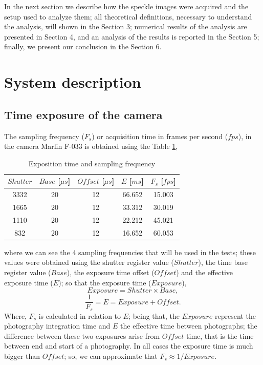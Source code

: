 \documentclass[review]{elsarticle}
\begin{document}
In the next section we describe how the speckle images were acquired and the setup used to analyze them; 
all theoretical definitions, necessary to understand the analysis, will shown in the Section 3;
numerical results of the analysis  are presented in Section 4, and
an analysis of the results is reported in the Section 5; finally, we present our
conclusion in the Section 6.

\section{System description}
\label{sec:description}




\subsection{Time exposure of the camera}
\label{subsec:expositiontime}
The sampling frequency ($F_s$) or acquisition time in frames per second ($fps$), 
in the camera Marlin F-033 is obtained using the 
 Table \ref{table:1}, 
\begin{table}[h!]
\centering
\begin{tabular}{||c c c c c||} 
 \hline
 $Shutter$ &  $Base$ [$\mu s$] & $Offset$ [$\mu s$] & $E$ [$ms$] & $F_s$ [$fps$]\\ [0.5ex] 
 \hline\hline
 3332  & 20  & 12  & 66.652  & 15.003  \\ 
 1665  & 20  & 12  & 33.312  & 30.019  \\ 
 1110  & 20  & 12  & 22.212  & 45.021  \\ 
 832   & 20  & 12  & 16.652  & 60.053  \\ [1ex] 
 \hline
\end{tabular}
\caption{Exposition time and sampling frequency}
\label{table:1}
\end{table}
where we can see the 4 sampling frequencies that will be used in the tests;
these values were obtained using  
the shutter register value ($Shutter$), 
the time base register value ($Base$),
the exposure time offset ($Offset$) and
the effective exposure time ($E$);
 so that the exposure time ($Exposure$),
\begin{equation}
Exposure= Shutter \times Base,
\end{equation}
\begin{equation}
\frac{1}{F_s}=E= Exposure + Offset.
\end{equation}
Where,  $F_s$ is calculated in relation to $E$; being that,
the $Exposure$ represent the photography integration time and $E$ the effective time
between photographs; 
the difference between these two exposures arise from $Offset$ time, 
that is the time between end and start of a photography.
In all cases the exposure time is much bigger than $Offset$; so, we can approximate
that $F_s\approx 1/Exposure$.
\end{document}
